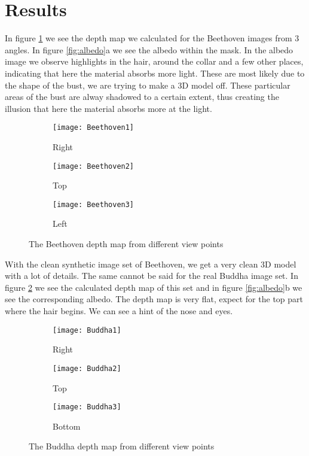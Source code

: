 \documentclass[12pt,a4paper,oneside,final]{article}
\begin{document}
\section{Results}
In figure \ref{fig:BeethovenDepth} we see the depth map we calculated for the Beethoven images from 3 angles. In figure \ref{fig:albedo}a we see the albedo within the mask. In the albedo image we observe highlights in the hair, around the collar and a few other places, indicating that here the material absorbs more light. These are most likely due to the shape of the bust, we are trying to make a 3D model off. These particular areas of the bust are alway shadowed to a certain extent, thus creating the illusion that here the material absorbs more at the light. 
\begin{figure}[H]
	\centering
	\begin{subfigure}{.33\textwidth}
		\centering
		\texttt{[image: Beethoven1]}
		\caption{Right}
	\end{subfigure}%
	\begin{subfigure}{.33\textwidth}
		\centering
		\texttt{[image: Beethoven2]}
		\caption{Top}
	\end{subfigure}%
	\begin{subfigure}{.33\textwidth}
		\centering
		\texttt{[image: Beethoven3]}
		\caption{Left}
	\end{subfigure}
	\caption{The Beethoven depth map from different view points}
	\label{fig:BeethovenDepth}
\end{figure}
With the clean synthetic image set of Beethoven, we get a very clean 3D model with a lot of details. The same cannot be said for the real Buddha image set. In figure \ref{fig:BuddahDepth} we see the calculated depth map of this set and in figure \ref{fig:albedo}b we see the corresponding albedo. The depth map is very flat, expect for the top part where the hair begins. We can see a hint of the nose and eyes.
\begin{figure}[H]
	\centering
	\begin{subfigure}{.33\textwidth}
		\centering
		\texttt{[image: Buddha1]}
		\caption{Right}
	\end{subfigure}%
	\begin{subfigure}{.33\textwidth}
		\centering
		\texttt{[image: Buddha2]}
		\caption{Top}
	\end{subfigure}%
	\begin{subfigure}{.33\textwidth}
		\centering
		\texttt{[image: Buddha3]}
		\caption{Bottom}
	\end{subfigure}
	\caption{The Buddha depth map from different view points}
	\label{fig:BuddahDepth}
\end{figure}
\end{document}

